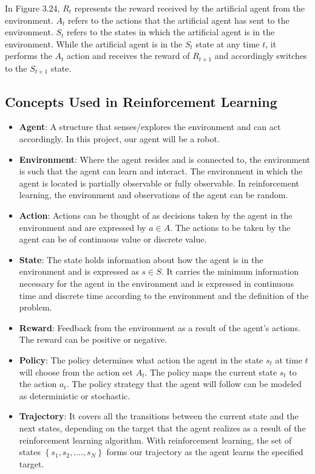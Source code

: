 \documentclass[12pt,twoside,a4]{mwbk}
\begin{document}
\noindent In Figure 3.24, $R_t$ represents the reward received by the artificial agent from the environment. $A_t$ refers to the actions that the artificial agent has sent to the environment. $S_t$ refers to the states in which the artificial agent is in the environment. While the artificial agent is in the $S_t$ state at any time $t$, it performs the $A_t$ action and receives the reward of $R_{t+1}$ and accordingly switches to the $S_{t+1}$ state.

\subsection{Concepts Used in Reinforcement Learning}
\begin{itemize}
    \item \textbf{Agent}: A structure that senses/explores the environment and can act accordingly. In this project, our agent will be a robot.

    \item \textbf{Environment}: Where the agent resides and is connected to, the environment is such that the agent can learn and interact. The environment in which the agent is located is partially observable or fully observable. In reinforcement learning, the environment and observations of the agent can be random.
    
    \item \textbf{Action}: Actions can be thought of as decisions taken by the agent in the environment and are expressed by $a \in A$. The actions to be taken by the agent can be of continuous value or discrete value.
    
    \item \textbf{State}: The state holds information about how the agent is in the environment and is expressed as $s \in S$. It carries the minimum information necessary for the agent in the environment and is expressed in continuous time and discrete time according to the environment and the definition of the problem.
    
    \item \textbf{Reward}: Feedback from the environment as a result of the agent's actions. The reward can be positive or negative.
    
    \item \textbf{Policy}: The policy determines what action the agent in the state $s_t$ at time $t$ will choose from the action set $A_t$. The policy maps the current state $s_t$ to the action $a_t$. The policy strategy that the agent will follow can be modeled as deterministic or stochastic.
    
    \item \textbf{Trajectory}: It covers all the transitions between the current state and the next states, depending on the target that the agent realizes as a result of the reinforcement learning algorithm. With reinforcement learning, the set of states $\left\{s_1, s_2, ...., s_N \right\}$ forms our trajectory as the agent learns the specified target.
\end{itemize}
\end{document}

